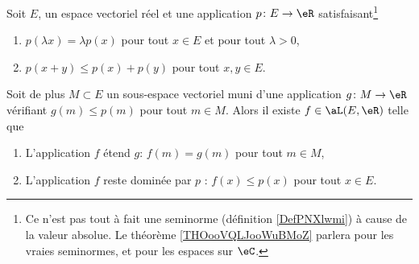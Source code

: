 \begin{theorem}		\label{THOooXALCooFrkvDo}
	Soit \( E\), un espace vectoriel réel et une application \( p\colon E\to \eR\) satisfaisant\footnote{Ce n'est pas tout à fait une seminorme (définition \ref{DefPNXlwmi}) à cause de la valeur absolue. Le théorème \ref{THOooVQLJooWuBMoZ} parlera pour les vraies seminormes, et pour les espaces sur \( \eC\).}
	\begin{enumerate}
		\item
		      \( p(\lambda x)=\lambda p(x)\) pour tout \( x\in E\) et pour tout \( \lambda>0\),
		\item
		      \( p(x+y)\leq p(x)+p(y)\) pour tout \( x,y\in E\).
	\end{enumerate}
	Soit de plus \( M\subset E\) un sous-espace vectoriel muni d'une application \( g\colon M\to \eR\) vérifiant \( g(m)\leq p(m)\) pour tout \( m\in M\). Alors il existe \( f\in\aL(E,\eR)\) telle que
	\begin{enumerate}
		\item
		      L'application \( f\) étend \( g\): \( f(m)=g(m)\) pour tout \( m\in M\),
		\item
		      L'application \( f\) reste dominée par \( p\) : \( f(x)\leq p(x)\) pour tout \( x\in E\).
	\end{enumerate}
\end{theorem}


